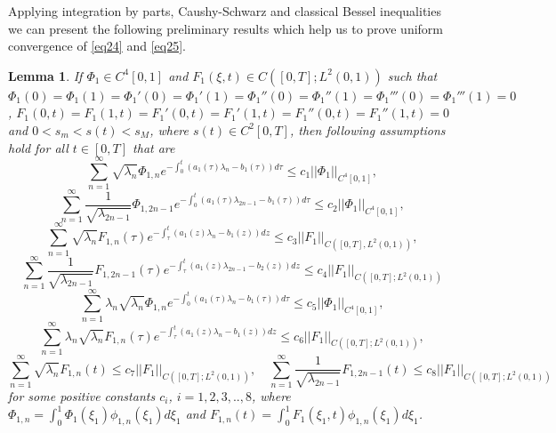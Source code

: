 \documentclass[preprint,12pt,authoryear]{elsarticle}
\newtheorem{lemma}{Lemma}
\begin{document}
Applying integration by parts, Caushy-Schwarz and classical Bessel inequalities we can present the following preliminary results which help us to prove uniform convergence of \eqref{eq24} and \eqref{eq25}.
\begin{lemma}\label{lem1}
    If $\Phi_1\in C^4[0,1]$ and $F_1(\xi,t)\in C([0,T];L^2(0,1))$ such that $\Phi_{1}(0)=\Phi_{1}(1)=\Phi_{1}'(0)=\Phi_{1}'(1)=\Phi_{1}''(0)=\Phi_{1}''(1)=\Phi_{1}'''(0)=\Phi_{1}'''(1)=0$, $F_1(0,t)=F_1(1,t)=F_1'(0,t)=F_1'(1,t)=F_1''(0,t)=F_1''(1,t)=0$ and $0<s_m<s(t)<s_M$, where $s(t)\in C^2[0,T]$, then following assumptions hold for all $t\in[0,T]$ that are
    \begin{equation}\label{eq26}
        \sum\limits_{n=1}^{\infty}\sqrt{\lambda_{n}}\Phi_{1,n}e^{-\int_0^t(a_1(\tau)\lambda_{n}-b_1(\tau))d\tau}\leq c_1||\Phi_1||_{C^4[0,1]},
    \end{equation}
    \begin{equation}\label{eq27}
        \sum\limits_{n=1}^{\infty}\dfrac{1}{\sqrt{\lambda_{2n-1}}}\Phi_{1,2n-1}e^{-\int_0^t(a_1(\tau)\lambda_{2n-1}-b_1(\tau))d\tau}\leq c_2||\Phi_1||_{C^4[0,1]},
    \end{equation}
    \begin{equation}\label{eq28}
        \sum\limits_{n=1}^{\infty}\sqrt{\lambda_{n}}F_{1,n}(\tau)e^{-\int_{\tau}^t(a_1(z)\lambda_{n}-b_1(z))dz}\leq c_3||F_1||_{C([0,T],L^2(0,1))},
    \end{equation}
    \begin{equation}\label{eq29}
        \sum\limits_{n=1}^{\infty}\dfrac{1}{\sqrt{\lambda_{2n-1}}}F_{1,2n-1}(\tau)e^{-\int_{\tau}^t(a_{1}(z)\lambda_{2n-1}-b_2(z))dz}\leq c_4||F_1||_{C([0,T];L^2(0,1))}
    \end{equation}
    \begin{equation}\label{eq30}
        \sum\limits_{n=1}^{\infty}\lambda_{n}\sqrt{\lambda_{n}}\Phi_{1,n}e^{-\int_0^t(a_1(\tau)\lambda_{n}-b_1(\tau))d\tau}\leq c_5 ||\Phi_1||_{C^4[0,1]},
    \end{equation}
    \begin{equation}\label{eq31}
        \sum\limits_{n=1}^{\infty}\lambda_{n}\sqrt{\lambda_{n}}F_{1,n}(\tau)e^{-\int_{\tau}^t(a_1(z)\lambda_{n}-b_1(z))dz}\leq c_6 ||F_1||_{C([0,T]; L^2(0,1))},
    \end{equation}
    \begin{equation}\label{eq32}
        \sum\limits_{n=1}^{\infty}\sqrt{\lambda_{n}}F_{1,n}(t)\leq c_7||F_1||_{C([0,T];L^2(0,1))},\quad \sum\limits_{n=1}^{\infty}\dfrac{1}{\sqrt{\lambda_{2n-1}}}F_{1,2n-1}(t)\leq c_8 ||F_1||_{C([0,T];L^2(0,1))}
    \end{equation}
for some positive constants $c_i$, $i=1,2,3,..,8$, where $\Phi_{1,n}=\int_0^1\Phi_{1}(\xi_1)\phi_{1,n}(\xi_1)d\xi_1$ and $F_{1,n}(t)=\int_0^1F_{1}(\xi_1,t)\phi_{1,n}(\xi_1)d\xi_1$.
\end{lemma}
\end{document}
